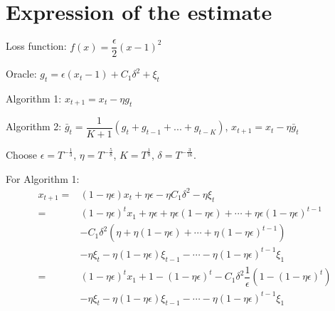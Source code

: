 \documentclass[11pt,letterpaper,english]{article}
\begin{document}
\section{Expression of the estimate}

Loss function: $f(x) = \dfrac{\epsilon}{2} (x-1)^2$

Oracle: $g_t = \epsilon (x_t-1) + C_1 \delta^2 + \xi_t$

Algorithm 1: $ x_{t+1} = x_t - \eta  g_t$

Algorithm 2: $\bar{g}_t = \dfrac{1}{K+1}  (g_t + g_{t-1} + ... + g_{t-K})$, 
$x_{t+1} = x_t - \eta  \bar{g}_t$

Choose $\epsilon = T^{-\frac{1}{3}}$, $\eta = T^{-\frac{5}{8}}$, $K = T^{\frac{1}{8}}$, $\delta=T^{-\frac{3}{16}}$.

For Algorithm 1:
\begin{align*}
x_{t+1} =& (1-\eta \epsilon) x_{t} + \eta \epsilon - \eta C_1 \delta^2-\eta \xi_{t}\\
=&  \left(1-\eta \epsilon\right)^t x_1+ \eta \epsilon+\eta \epsilon\left(1-\eta \epsilon\right)+\cdots + \eta \epsilon\left(1-\eta \epsilon\right)^{t-1}\\
&-C_1 \delta^2\left( \eta + \eta\left( 1-\eta \epsilon \right)+\cdots + \eta \left(1-\eta \epsilon\right)^{t-1} \right) \\
&-\eta \xi_t -\eta \left(1-\eta \epsilon\right)\xi_{t-1}- \cdots -\eta \left(1-\eta \epsilon\right)^{t-1}\xi_{1}\\
=& \left(1-\eta \epsilon\right)^t x_1+ 1-\left(1-\eta \epsilon \right)^t
-C_1 \delta^2 \dfrac{1}{\epsilon}\left( 1-\left(1-\eta \epsilon \right)^t \right)\\
&- \eta \xi_t -\eta \left(1-\eta \epsilon\right)\xi_{t-1}- \cdots -\eta \left(1-\eta \epsilon\right)^{t-1}\xi_{1}
\end{align*}
\end{document}
